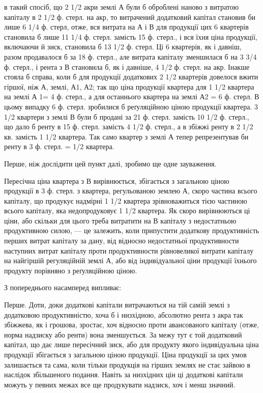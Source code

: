 \parcont{}  %
в такий спосіб, що 2 1/2 акри землі А були б оброблені наново з витратою капіталу
в 2  1/2 ф. стерл. на акр, то витрачений додатковий капітал становив би
лише 6  1/4 ф. стерл, отже, вся витрата на А і В для продукції цих 6 квартерів
становила б лише 11  1/4 ф. стерл. замість 15 ф. стерл., і вся їхня ціна
продукції, включаючи й зиск, становила б 13 1/2 ф. стерл. Ці 6 квартерів, як
і давніш, разом продавалося б за 18 ф. стерл., але витрата капіталу зменшилася
б на 3  3/4 ф. стерл., і рента з В становила б, як і давніше, 4  1/2 ф. стерл.
на акр. Інакше стояла б справа, коли б для продукції додаткових 2  1/2 квартерів
довелося вжити гіршої, ніж А, землі, А1, А2; так що ціна продукції
квартера для 1  1/2 квартера на землі А 1= 4 ф. стерл., а для останнього
квартера на землі А2 = 6 ф. стерл. В цьому випадку 6 ф. стерл.
зробилися б реґуляційною ціною продукції квартера. 3  1/2 квартери з землі В
були б продані за 21 ф. стерл. замість 10  1/2 ф. стерл., що дало б ренту в 15 ф.
стерл. замість 4  1/2 ф. стерл., а в збіжжі ренту в 2  1/2 кв. замість 1  1/2 квартера.
Так само квартер з землі А тепер репрезентував би ренту в 3 ф. стерл. =
1/2 квартера.

Перше, ніж дослідити цей пункт далі, зробимо ще одне зауваження.

Пересічна ціна квартера з В вирівнюється, збігається з загальною ціною
продукції в 3 ф. стерл. з квартера, регульованою землею А, скоро частина
всього капіталу, що продукує надмірні 1  1/2 квартера зрівноважиться тією частиною
всього капіталу, яка недопродуковує 1  1/2 квартера. Як скоро вирівнюються
ці ціни, або скільки для цього треба витратити на В капіталу з недостатньою
продуктивною силою, — це залежить, коли припустити додаткову
продуктивність перших витрат капіталу за дану, від відносно недостатньої продуктивности
наступних витрат капіталу проти продуктивности рівновеликої витрати
капіталу на найгіршій регуляційній землі А, або від індивідуальної ціни
продукції їхнього продукту порівняно з реґуляційною ціною.

З попереднього насамперед випливає:

Перше. Доти, доки додаткові капітали витрачаються на тій самій землі
з додатковою продуктивністю, хоча б і низхідною, абсолютно рента з акра
так збіжжева, як і грошова, зростає, хоч відносно проти авансованого капіталу
(отже, норма надзиску або ренти) вона зменшується. За межу тут є той додатковий
капітал, що дає лише пересічний зиск, або для продукту якого індивідуальна
ціна продукції збігається з загальною ціною продукції. Ціна продукції
за цих умов залишається та сама, коли тільки продукція на гірших землях
не стає зайвою в наслідок збільшеного подання. Навіть за низхідних цін ці
додаткові капітали можуть у певних межах все ще продукувати надзиск, хоч
і менш значний.

